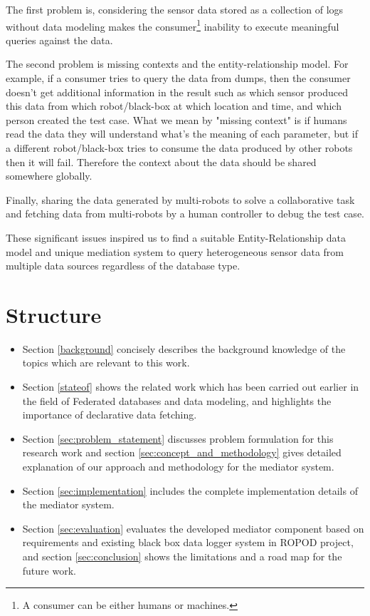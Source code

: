 		The first problem is, considering the sensor data stored as a collection of logs without data modeling makes the consumer\footnote{A consumer can be either humans or machines.} inability to execute meaningful queries against the data. 
		
		The second problem is missing contexts and the entity-relationship model. For example, if a consumer tries to query the data from dumps, then the consumer doesn't get additional information in the result such as which sensor produced this data from which robot/black-box at which location and time, and which person created the test case. What we mean by "missing context" is if humans read the data they will understand what's the meaning of each parameter, but if a different robot/black-box tries to consume the data produced by other robots then it will fail. Therefore the context about the data should be shared somewhere globally.
		
		Finally, sharing the data generated by multi-robots to solve a collaborative task and fetching data from multi-robots by a human controller to debug the test case.
		
		These significant issues inspired us to find a suitable Entity-Relationship data model and unique mediation system to query heterogeneous sensor data from multiple data sources regardless of the database type.


    \section{Structure}
	
		\begin{itemize}
			\item Section \ref{background} concisely describes the background knowledge of the topics which are relevant to this work.
			\item Section \ref{stateof} shows the related work which has been carried out earlier in the field of Federated databases and data modeling, and highlights the importance of declarative data fetching.
			\item Section \ref{sec:problem_statement} discusses problem formulation for this research work and section \ref{sec:concept_and_methodology} gives detailed explanation of our approach and methodology for the mediator system.
			\item Section \ref{sec:implementation} includes the complete implementation details of the mediator system.
			\item Section \ref{sec:evaluation} evaluates the developed mediator component based on requirements and existing black box data logger system in ROPOD project, and section \ref{sec:conclusion} shows the limitations and a road map for the future work. 
		\end{itemize}

\let\cleardoublepage\clearpage

